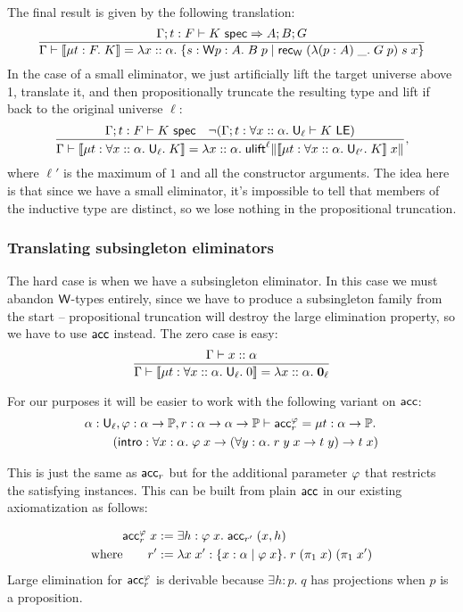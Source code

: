 The final result is given by the following translation:
$$\frac{\Gamma;t:F\vdash K\spec\Rightarrow A;B;G}
{\Gamma\vdash\scott{\mu t:F.\;K}=\lambda x::\alpha.\;\{s:\W p:A.\;B\;p\mid \rec_\W\;(\lambda (p:A)\; \_.\;G\;p)\;s\;x\}}$$
In the case of a small eliminator, we just artificially lift the target universe above 1, translate it, and then propositionally truncate the resulting type and lift if back to the original universe $\ell$:
$$\frac{\Gamma;t:F\vdash K\spec\quad \neg(\Gamma;t:\forall x::\alpha.\;\U_\ell\vdash K\LE)}
{\Gamma\vdash\scott{\mu t:\forall x::\alpha.\;\U_\ell.\;K}=\lambda x::\alpha.\;\ulift^\ell\|\scott{\mu t:\forall x::\alpha.\;\U_{\ell'}.\;K}\;x\|},$$
where $\ell'$ is the maximum of $1$ and all the constructor arguments. The idea here is that since we have a small eliminator, it's impossible to tell that members of the inductive type are distinct, so we lose nothing in the propositional truncation.

\subsubsection{Translating subsingleton eliminators}
The hard case is when we have a subsingleton eliminator. In this case we must abandon $\mathsf{W}$-types entirely, since we have to produce a subsingleton family from the start -- propositional truncation will destroy the large elimination property, so we have to use $\mathsf{acc}$ instead. The zero case is easy:
$$\frac{\Gamma\vdash x::\alpha}
{\Gamma\vdash\scott{\mu t:\forall x::\alpha.\;\U_\ell.\;0}=\lambda x::\alpha.\;{\bf 0}_\ell}$$

For our purposes it will be easier to work with the following variant on $\mathsf{acc}$:
\begin{align*}
&\alpha:\mathsf{U}_\ell,\varphi:\alpha\to\mathbb{P},r:\alpha\to\alpha\to\mathbb{P}\vdash\mathsf{acc}^\varphi_r=\mu t:\alpha\to\mathbb{P}.\\
&\qquad\;(\mathsf{intro}:\forall x:\alpha.\;\varphi\;x\to(\forall y:\alpha.\;r\;y\;x\to t\;y)\to t\;x)
\end{align*}

This is just the same as $\mathsf{acc}_r$ but for the additional parameter $\varphi$ that restricts the satisfying instances. This can be built from plain $\mathsf{acc}$ in our existing axiomatization as follows:

\begin{align*}
\mathsf{acc}^\varphi_r\;x&:=\exists h:\varphi\;x.\;\mathsf{acc}_{r'}\;(x,h)\\
\mbox{where}\qquad r'&:=\lambda x\;x':\{x:\alpha\mid \varphi\;x\}.\;r\;(\pi_1\;x)\;(\pi_1\;x')
\end{align*}
Large elimination for $\mathsf{acc}^\varphi_r$ is derivable because $\exists h:p.\;q$ has projections when $p$ is a proposition.

